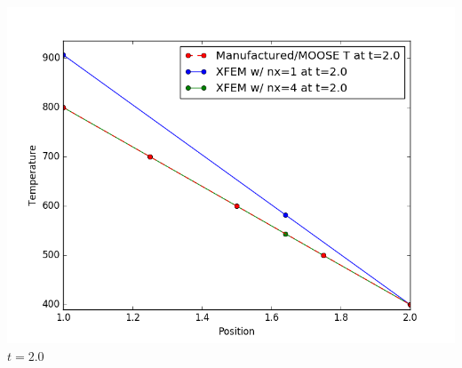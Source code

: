 \documentclass[]{beamer}
\begin{document}
\begin{frame}[t]
\begin{columns}
\begin{center}
			\includegraphics[scale=0.17]{figures/1D_rz_ls1mat_u_vs_x_20}\\
			$t=2.0$
			\end{center}
	\end{columns}
\end{frame}
\end{document}
